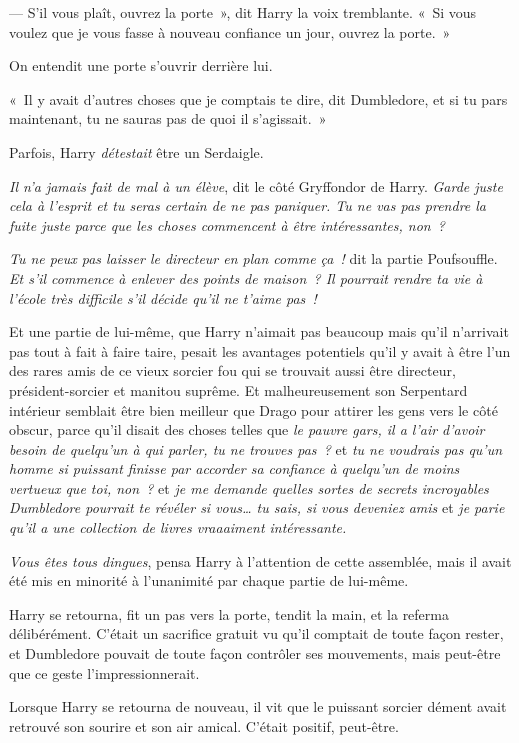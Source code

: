 --- S'il vous plaît, ouvrez la porte~», dit Harry la voix tremblante.
«~Si vous voulez que je vous fasse à nouveau confiance un jour, ouvrez la porte.~»

On entendit une porte s'ouvrir derrière lui.

«~Il y avait d'autres choses que je comptais te dire, dit Dumbledore, et si tu pars maintenant, tu ne sauras pas de quoi il s'agissait.~»

Parfois, Harry \emph{détestait} être un Serdaigle.

\emph{Il n'a jamais fait de mal à un élève}, dit le côté Gryffondor de Harry.
\emph{Garde juste cela à l'esprit et tu seras certain de ne pas paniquer.
Tu ne vas pas prendre la fuite juste parce que les choses commencent à être intéressantes, non~?}

\emph{Tu ne peux pas laisser le directeur en plan comme ça~!} dit la partie Poufsouffle.
\emph{Et s'il commence à enlever des points de maison~?
Il pourrait rendre ta vie à l'école très difficile s'il décide qu'il ne t'aime pas~!}

Et une partie de lui-même, que Harry n'aimait pas beaucoup mais qu'il n'arrivait pas tout à fait à faire taire, pesait les avantages potentiels qu'il y avait à être l'un des rares amis de ce vieux sorcier fou qui se trouvait aussi être directeur, président-sorcier et manitou suprême.
Et malheureusement son Serpentard intérieur semblait être bien meilleur que Drago pour attirer les gens vers le côté obscur, parce qu'il disait des choses telles que \emph{le pauvre gars, il a l'air d'avoir besoin de quelqu'un à qui parler, tu ne trouves pas~?} et \emph{tu ne voudrais pas qu'un homme si puissant finisse par accorder sa confiance à quelqu'un de moins vertueux que toi, non~?} et \emph{je me demande quelles sortes de secrets incroyables Dumbledore pourrait te révéler si vous… tu sais, si vous deveniez amis} et \emph{je parie qu'il a une collection de livres vraaaiment intéressante.}

\emph{Vous êtes tous dingues}, pensa Harry à l'attention de cette assemblée, mais il avait été mis en minorité à l'unanimité par chaque partie de lui-même.

Harry se retourna, fit un pas vers la porte, tendit la main, et la referma délibérément.
C'était un sacrifice gratuit vu qu'il comptait de toute façon rester, et Dumbledore pouvait de toute façon contrôler ses mouvements, mais peut-être que ce geste l'impressionnerait.

Lorsque Harry se retourna de nouveau, il vit que le puissant sorcier dément avait retrouvé son sourire et son air amical.
C'était positif, peut-être.

